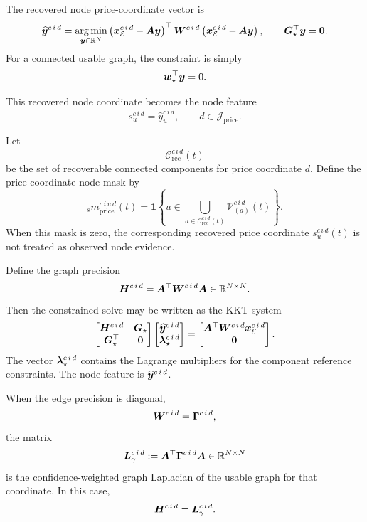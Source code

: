 The recovered node price-coordinate vector is
\[
  \widehat{\bm{y}}^{c\,i\,d}
  =
  \operatorname*{arg\,min}_{\bm{y}\in\mathbb{R}^N}
  \left(
    \bm{x}_{\mathcal{E}}^{c\,i\,d}
    -
    \bm{A}\bm{y}
  \right)^{\top}
  \bm{W}^{c\,i\,d}
  \left(
    \bm{x}_{\mathcal{E}}^{c\,i\,d}
    -
    \bm{A}\bm{y}
  \right),
  \qquad
  \bm{G}_{\star}^{\top}\bm{y}=\bm{0}.
\]
For a connected usable graph, the constraint is simply
\[
  \bm{w}_{\star}^{\top}\bm{y}=0.
\]

This recovered node coordinate becomes the node feature
\[
  s_u^{c\,i\,d}
  =
  \widehat{y}_{u}^{c\,i\,d},
  \qquad
  d\in\mathcal{J}_{\mathrm{price}}.
\]

Let
\[
  \mathcal{C}_{\mathrm{rec}}^{c\,i\,d}(t)
\]
be the set of recoverable connected components for price coordinate $d$.  Define
the price-coordinate node mask by
\[
  {}_{s}m_{\mathrm{price}}^{c\,i\,u\,d}(t)
  =
  \mathbf{1}
  \left\{
    u
    \in
    \bigcup_{a\in\mathcal{C}_{\mathrm{rec}}^{c\,i\,d}(t)}
    \mathcal{V}_{(a)}^{c\,i\,d}(t)
  \right\}.
\]
When this mask is zero, the corresponding recovered price coordinate
$s_u^{c\,i\,d}(t)$ is not treated as observed node evidence.

Define the graph precision
\[
  \bm{H}^{c\,i\,d}
  =
  \bm{A}^{\top}
  \bm{W}^{c\,i\,d}
  \bm{A}
  \in
  \mathbb{R}^{N\times N}.
\]
Then the constrained solve may be written as the KKT system
\[
  \begin{bmatrix}
    \bm{H}^{c\,i\,d} & \bm{G}_{\star}\\
    \bm{G}_{\star}^{\top} & \bm{0}
  \end{bmatrix}
  \begin{bmatrix}
    \widehat{\bm{y}}^{c\,i\,d}\\
    \bm{\lambda}_{\star}^{c\,i\,d}
  \end{bmatrix}
  =
  \begin{bmatrix}
    \bm{A}^{\top}
    \bm{W}^{c\,i\,d}
    \bm{x}_{\mathcal{E}}^{c\,i\,d}\\
    \bm{0}
  \end{bmatrix}.
\]
The vector $\bm{\lambda}_{\star}^{c\,i\,d}$ contains the Lagrange multipliers
for the component reference constraints.  The node feature is
$\widehat{\bm{y}}^{c\,i\,d}$.

When the edge precision is diagonal,
\[
  \bm{W}^{c\,i\,d}
  =
  \bm{\Gamma}^{c\,i\,d},
\]
the matrix
\[
  \bm{L}_{\gamma}^{c\,i\,d}
  :=
  \bm{A}^{\top}
  \bm{\Gamma}^{c\,i\,d}
  \bm{A}
  \in
  \mathbb{R}^{N\times N}
\]
is the confidence-weighted graph Laplacian of the usable graph for that
coordinate.  In this case,
\[
  \bm{H}^{c\,i\,d}
  =
  \bm{L}_{\gamma}^{c\,i\,d}.
\]

